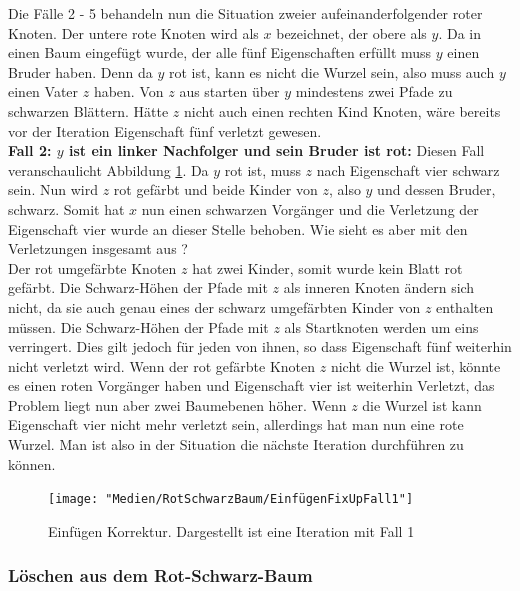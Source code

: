 \documentclass[a4paper,12pt]{article}
\begin{document}
\noindent Die Fälle 2 - 5 behandeln nun die Situation zweier aufeinanderfolgender roter Knoten. Der untere rote Knoten wird als $x$ bezeichnet, der obere als $y$. Da in einen Baum eingefügt wurde, der alle fünf Eigenschaften erfüllt muss $y$ einen Bruder haben.  Denn da $y$ rot ist, kann es nicht die Wurzel sein, also muss auch $y$ einen Vater $z$ haben. Von $z$ aus starten über $y$ mindestens zwei Pfade zu schwarzen Blättern. Hätte $z$ nicht auch einen rechten Kind Knoten, wäre bereits vor der Iteration Eigenschaft fünf verletzt gewesen.  \\
\noindent\textbf{Fall 2: $y$ ist ein linker Nachfolger und sein Bruder ist rot: }
\noindent Diesen Fall veranschaulicht Abbildung \ref{fig:EinfügenFixUpFall1}. Da $y$ rot ist, muss $z$ nach Eigenschaft vier schwarz sein. Nun wird $z$ rot gefärbt und beide Kinder von $z$, also $y$ und dessen Bruder, schwarz. Somit hat $x$ nun einen schwarzen Vorgänger und die Verletzung der Eigenschaft vier wurde an dieser Stelle behoben. Wie sieht es aber mit den Verletzungen insgesamt aus ? \\
Der rot umgefärbte Knoten $z$ hat zwei Kinder, somit wurde kein Blatt rot gefärbt. Die Schwarz-Höhen der Pfade mit $z$ als inneren Knoten ändern sich nicht, da sie auch genau eines der schwarz umgefärbten Kinder von $z$ enthalten müssen. Die Schwarz-Höhen der Pfade mit $z$ als Startknoten werden um eins verringert. Dies gilt jedoch für jeden von ihnen, so dass Eigenschaft fünf weiterhin nicht verletzt wird. Wenn der rot gefärbte Knoten $z$ nicht die Wurzel ist, könnte es einen roten Vorgänger haben und Eigenschaft vier ist weiterhin Verletzt, das Problem liegt nun aber zwei Baumebenen höher. Wenn $z$ die Wurzel ist kann Eigenschaft vier nicht mehr verletzt sein, allerdings hat man nun eine rote Wurzel. Man ist also in der Situation die nächste Iteration durchführen zu können.\\
     


\begin{figure}[h]
	\centering
	\texttt{[image: "Medien/RotSchwarzBaum/EinfügenFixUpFall1"]}
	\caption{Einfügen Korrektur. Dargestellt ist eine Iteration mit Fall 1  }
	\label{fig:EinfügenFixUpFall1}
\end{figure}



   
\subsubsection{Löschen aus dem Rot-Schwarz-Baum}
\end{document}
